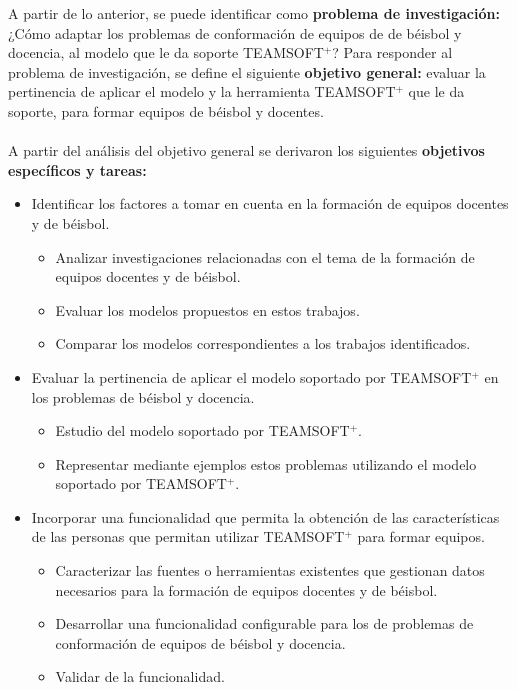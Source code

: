 A partir de lo anterior, se puede identificar como \textbf{problema de investigación:} ¿Cómo adaptar los problemas de conformación de equipos de de béisbol y docencia, al modelo que le da soporte TEAMSOFT$^+$? Para responder al problema de investigación, se define el siguiente \textbf{objetivo general:} evaluar la pertinencia de aplicar el modelo y la herramienta TEAMSOFT$^+$ que le da soporte, para formar equipos de béisbol y docentes.\\\\
A partir del análisis del objetivo general se derivaron los siguientes \textbf{objetivos específicos y tareas:}
\begin{itemize}		
	\item Identificar los factores a tomar en cuenta en la formación de equipos docentes y de béisbol.
		\begin{itemize}
			\item Analizar investigaciones relacionadas con el tema de la formación de equipos docentes y de béisbol.
			\item Evaluar los modelos propuestos en estos trabajos.
			\item Comparar los modelos correspondientes a los trabajos identificados.
		\end{itemize}
		

	
	\item Evaluar la pertinencia de aplicar el modelo soportado por TEAMSOFT$^+$ en los problemas de béisbol y docencia.
		\begin{itemize}
			\item Estudio del modelo soportado por TEAMSOFT$^+$.
			\item Representar mediante ejemplos estos problemas utilizando el modelo soportado por TEAMSOFT$^+$.
		\end{itemize}
		
	\item Incorporar una funcionalidad que permita la obtención de las características de las personas que permitan utilizar TEAMSOFT$^+$ para formar equipos.
		\begin{itemize}
			\item Caracterizar las fuentes o herramientas existentes que gestionan datos necesarios para la formación de equipos docentes y de béisbol.
			\item Desarrollar una funcionalidad configurable para los de problemas de conformación de equipos de béisbol y docencia.
			\item Validar de la funcionalidad.
		\end{itemize}
\end{itemize}


